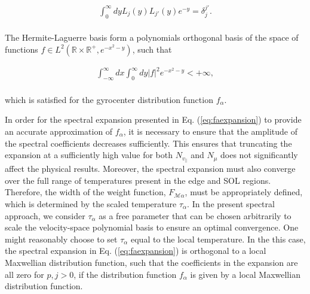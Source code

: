 \documentclass[preprint,12pt]{elsarticle}
\renewcommand{\a}{\alpha}
\begin{document}
\begin{align}\label{eq:ortholaguerre}
  \int_0^\infty d y L_j(y) L_{j'}(y) e^{- y} = \delta_j^{j'}.
\end{align}
\\
The Hermite-Laguerre basis form a polynomials orthogonal basis of the space of functions $f \in L^2( \mathbb{R } \times \mathbb{R}^+, e^{-x^2 - y}) $, such that

\begin{align} \label{eq:functionspace}
\int_{- \infty}^\infty dx  \int_0^\infty d y \left| f \right|^2 e^{-x^2 - y}  < + \infty,
\end{align}
\\
which is satisfied for the gyrocenter distribution function $f_\alpha$.

In order for the spectral expansion presented in Eq. (\ref{eq:faexpansion}) to provide an accurate approximation of $f_\a$, it is necessary to ensure that the amplitude of the spectral coefficients decreases sufficiently. This ensures that truncating the expansion at a sufficiently high value for both $N_{v_\parallel}$ and $N_{\mu}$ does not significantly affect the physical results. Moreover, the spectral expansion must also converge over the full range of temperatures present in the edge and SOL regions. Therefore, the width of the weight function, $F_{\mathcal{M \alpha}}$, must be appropriately defined, which is determined by the scaled temperature $\tau_\alpha$. In the present spectral approach, we consider $\tau_\a$ as a free parameter that can be chosen arbitrarily to scale the velocity-space polynomial basis to ensure an optimal convergence. One might reasonably choose to set $\tau_\alpha$ equal to the local temperature. In the this case, the spectral expansion in Eq. (\ref{eq:faexpansion}) is orthogonal to a local Maxwellian distribution function, such that the coefficients in the expansion are all zero for $p, j > 0$, if the distribution function $f_\alpha$ is given by a local Maxwellian distribution function.
\end{document}
